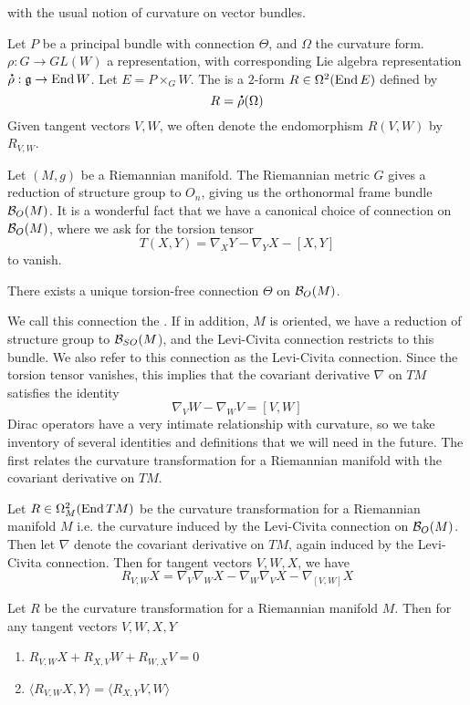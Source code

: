 with the usual notion of curvature on vector bundles.
%
\begin{defn}
Let $P$ be a principal bundle with connection $\Theta$, and $\Omega$ the curvature form.
$\rho : G \to GL(W)$ a representation, with corresponding Lie algebra representation
$\accentset{\mbox{\large\bfseries .}}{\rho} : \mathfrak{g} \to \operatorname{End} W$. Let $E = P \times_G W$. The 
is a $2$-form $R \in \Omega^2(\operatorname{End} E)$ defined by
\[
R = \accentset{\mbox{\large\bfseries .}}{\rho}(\Omega)
\]
Given tangent vectors $V,W$, we often denote the endomorphism $R(V,W)$ by $R_{V,W}$.
\end{defn}
%
Let $(M,g)$ be a Riemannian manifold. The Riemannian metric $G$ gives a
reduction of structure group to $O_n$, giving us the orthonormal frame bundle
$\mathcal{B}_O(M)$. It is a wonderful fact that we have a canonical choice of connection
on $\mathcal{B}_O(M)$, where we ask for the torsion tensor
\[
T(X,Y) = \nabla_XY -\nabla_Y X - [X,Y]
\]
to vanish.
%
\begin{thm}
 There exists a unique torsion-free connection $\Theta$ on $\mathcal{B}_O(M)$.
\end{thm}
We call this connection the . If in addition,
$M$ is oriented, we have a reduction of structure group to $\mathcal{B}_{SO}(M$), and
the Levi-Civita connection restricts to this bundle. We also refer to this
connection as the Levi-Civita connection. Since the torsion tensor vanishes, this
implies that the covariant derivative $\nabla$ on $TM$ satisfies the identity
\[
\nabla_VW - \nabla_WV = [V,W]
\]
%
Dirac operators have a very intimate relationship with curvature, so we
take inventory of several identities and definitions that we will need in the future.
The first relates the curvature transformation for a Riemannian manifold with the
covariant derivative on $TM$.
%
\begin{prop}
Let $R \in \Omega^2_M(\operatorname{End} TM)$ be the curvature transformation for a Riemannian
manifold $M$ i.e. the curvature induced by the Levi-Civita connection on $\mathcal{B}_{O}(M)$.
Then let $\nabla$ denote the covariant derivative on $TM$, again induced by
the Levi-Civita connection. Then for tangent vectors $V,W,X$, we have
\[
R_{V,W}X = \nabla_V\nabla_W X - \nabla_W\nabla_V X - \nabla_{[V,W]} X
\]
\end{prop}
%
\begin{prop}
Let $R$ be the curvature transformation for a Riemannian manifold $M$. Then for any
tangent vectors $V,W,X,Y$
\begin{enumerate}
  \item $R_{V, W}X + R_{X, V}W + R_{W, X}V = 0$
  \item $\langle R_{V,W}X,Y\rangle = \langle R_{X,Y}V, W\rangle$
\end{enumerate}
\end{prop}
%